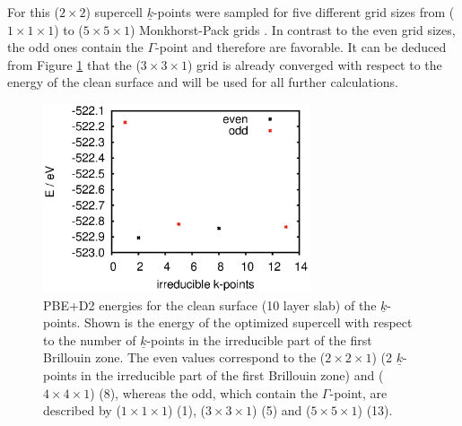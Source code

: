 \documentclass[11pt,DIV=13,BCOR=5mm,a4paper,headinclude]{scrbook}
\renewcommand{\vec}[1]{\underline{#1}}
\begin{document}
For this ($2\times 2$) supercell $\vec{k}$-points were sampled for five different grid sizes from ($1\times 1\times 1$) to ($5\times 5\times 1$) Monkhorst-Pack grids \cite{monkhorst}.
In contrast to the even grid sizes, the odd ones contain the $\Gamma$-point and therefore are favorable.
It can be deduced from Figure \ref{abb:11-20-kpointsampling} that the ($3\times 3\times 1$) grid is already converged with respect to the energy of the clean surface and will be used for all further calculations.
\begin{figure}[!h]
\centering
 \includegraphics[width=0.7\textwidth]{figures/11-20/irreducibles-E.eps}
   \caption{PBE+D2 energies for the clean surface (10 layer slab) of the $\vec{k}$-points. Shown is the energy of the optimized supercell with respect to the number of $\vec{k}$-points in the irreducible part of the first Brillouin zone.
The even values correspond to the ($2\times 2 \times 1$) (2 $\vec{k}$-points in the irreducible part of the first Brillouin zone) and ($4\times 4\times 1$) (8), whereas the odd, which contain the $\Gamma$-point, are described by ($1\times 1\times 1$) (1), ($3\times 3\times 1$) (5) and ($5\times 5\times 1$) (13).}
            \label{abb:11-20-kpointsampling}
\end{figure}
\end{document}
